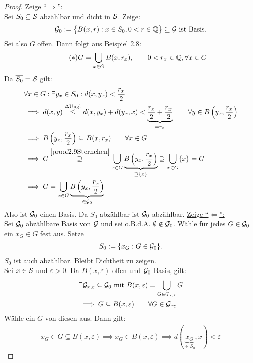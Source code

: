 \begin{proof}
	\underline{Zeige ``$\Rightarrow$'':}\\
	Sei $S_0\subseteq\S$ abzählbar und dicht in $\S$. Zeige:
	\begin{align*}
		\G_0:=\big\lbrace B(x,r):x\in S_0,0<r\in\Q\big\rbrace\subseteq\G\text{ ist Basis.}
	\end{align*}
	Sei also $G$ offen. Dann folgt aus Beispiel 2.8:
	\begin{align}\label{proof2.9Sternchen}\tag{$\ast$}
		G=\bigcup\limits_{x\in G} B(x,r_x),\qquad 0<r_x\in\Q,\forall x\in G
	\end{align}
	Da $\overline{S_0}=\S$ gilt:
	\begin{align*}
		&\forall x\in G:\exists y_x\in S_0: d(x,y_x)<\frac{r_x}{2}\\
		&\implies d(x,y)
		\stackrel{\Delta\text{Ungl}}{\leq}
		d(x,y_x)+d(y_x,x)< \underbrace{\frac{r_x}{2}+\frac{r_x}{2}}_{=r_x}\qquad\forall y\in B\left(y_x,\frac{r_x}{2}\right)\\
		&\implies B\left(y_x,\frac{r_x}{2}\right)\subseteq B(x,r_x)\qquad\forall x\in G\\
		&\implies G\stackrel{\eqref{proof2.9Sternchen}}{\supseteq}
		\bigcup\limits_{x\in G}\underbrace{B\left(y_x,\frac{r_x}{2}\right)}_{\supseteq\lbrace x\rbrace}
		\supseteq\bigcup\limits_{x\in G}\lbrace x\rbrace=G\\
		&\implies G=\bigcup	\limits_{x\in G}\underbrace{B\left(y_x,\frac{r_x}{2}\right)}_{\in\G_0}
	\end{align*}
	Also ist $\G_0$ einen Basis. Da $S_0$ abzählbar ist $\G_0$ abzählbar.\nl
	\underline{Zeige ``$\Leftarrow$'':}\\
	Sei $\G_0$ abzählbare Basis von $\G$ und sei o.B.d.A. $\emptyset\notin\G_0$. Wähle für jedes $G\in\G_0$ ein $x_G\in G$ fest aus. Setze
	\begin{align*}
		S_0:=\lbrace x_G:G\in\G_0\rbrace.
	\end{align*}
	$S_0$ ist auch abzählbar. Bleibt Dichtheit zu zeigen.\\
	Sei $x\in\S$ und $\varepsilon>0$. Da $B(x,\varepsilon)$ offen und $\G_0$ Basis, gilt: 
	\begin{align*}
		&\exists\G_{x,\varepsilon}\subseteq\G_0\mit B(x,\varepsilon)=\bigcup\limits_{G\in\G_{x,\varepsilon}} G\\
		&\implies G\subseteq B(x,\varepsilon)\qquad\forall G\in\G_{x\varepsilon}
	\end{align*}
	Wähle ein $G$ von diesen aus. Dann gilt:
	\begin{align*}
		x_G\in G\subseteq B(x,\varepsilon)
		\implies x_G\in B(x,\varepsilon)
		\implies d(\underbrace{x_G}_{\in S_0},x)<\varepsilon
	\end{align*}
\end{proof}

